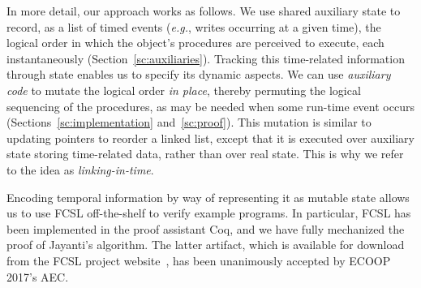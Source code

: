 \documentclass[a4paper,UKenglish]{lipics-v2016}
\newcommand{\eg}{\emph{e.g.}\xspace}
\newcommand{\esc}[1]{\text{\texttt{\small{#1}}}}
\theoremstyle{definition}
\begin{document}
In more detail, our approach works as follows.
%
We use shared auxiliary state to record, as a list of timed events
(\eg, writes occurring at a given time), the logical order in which
the object's procedures are perceived to execute, each instantaneously
(Section~\ref{sc:auxiliaries}). Tracking this time-related information
through state enables us to specify its dynamic aspects. We can use
\emph{auxiliary code} to mutate the logical order \emph{in place},
thereby permuting the logical sequencing of the procedures, as may be
needed when some run-time event occurs
(Sections~\ref{sc:implementation} and~\ref{sc:proof}). This mutation
is similar to updating pointers to reorder a linked list, except that
it is executed over auxiliary state storing time-related data, rather
than over real state. This is why we refer to the idea as
\emph{linking-in-time}.

Encoding temporal information by way of representing it as mutable
state allows us to use FCSL off-the-shelf to verify example
programs. In particular, FCSL has been implemented in the proof
assistant Coq, and we have fully mechanized the proof of Jayanti's
algorithm. The latter artifact, which is available for download from
the FCSL project website~\cite{FCSL:Project}, has been unanimously
accepted by ECOOP 2017's AEC.


%



\newcommand{\fx}{\mathit{fx}}
\newcommand{\fy}{\mathit{fy}}
\newcommand{\x}{x}
\newcommand{\y}{y}
\newcommand{\s}{S}


\newcommand{\fwdp}[1]{(\esc{fwd}~#1)}
\newcommand{\aleksfwdp}[1]{\esc{fwd}~#1}
\end{document}
